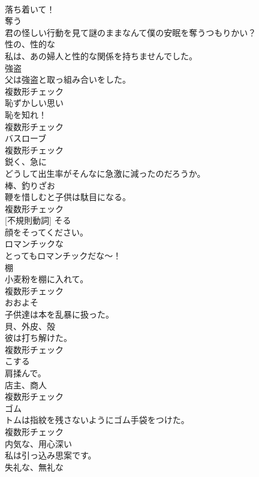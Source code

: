 \documentclass[8pt]{extreport}
\begin{document}
\begin{CJK}{UTF8}{min}
\\	落ち着いて！	
\\	[動詞]	奪う	
\\	君の怪しい行動を見て謎のままなんて僕の安眠を奪うつもりかい？	
\\	[形容詞]	性の、性的な	
\\	私は、あの婦人と性的な関係を持ちませんでした。	
\\	[名詞]	強盗	
\\	父は強盗と取っ組み合いをした。	
\\	複数形チェック
\\	[名詞]	恥ずかしい思い	
\\	恥を知れ！	
\\	複数形チェック
\\	[名詞]	バスローブ	
\\	複数形チェック
\\	[副詞]	鋭く、急に	
\\	どうして出生率がそんなに急激に減ったのだろうか。	
\\	[名詞]	棒、釣りざお	
\\	鞭を惜しむと子供は駄目になる。	
\\	複数形チェック
\\	[動詞] [不規則動詞]	そる	
\\	顔をそってください。	
\\	[形容詞]	ロマンチックな	
\\	とってもロマンチックだな～！	
\\	[名詞]	棚	
\\	小麦粉を棚に入れて。	
\\	複数形チェック
\\	[副詞]	おおよそ	
\\	子供達は本を乱暴に扱った。	
\\	[名詞]	貝、外皮、殻	
\\	彼は打ち解けた。	
\\	複数形チェック
\\	[動詞]	こする	
\\	肩揉んで。	
\\	[名詞]	店主、商人	
\\	複数形チェック
\\	[名詞]	ゴム	
\\	トムは指紋を残さないようにゴム手袋をつけた。	
\\	複数形チェック
\\	[形容詞]	内気な、用心深い	
\\	私は引っ込み思案です。	
\\	[形容詞]	失礼な、無礼な	

\end{CJK}
\end{document}
